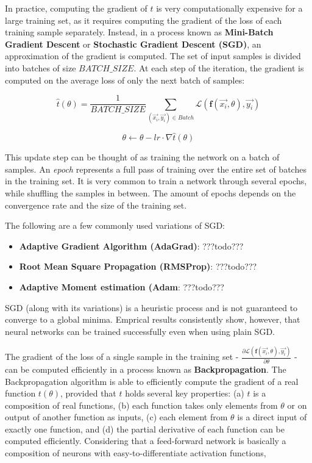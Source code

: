 In practice, computing the gradient of $t$ is very computationally expensive for a large training set, as it requires computing the gradient of the loss of each training sample separately. Instead, in a process known as \textbf{Mini-Batch Gradient Descent} or \textbf{Stochastic Gradient Descent (SGD)}, an approximation of the gradient is computed. The set of input samples is divided into batches of size $BATCH\_SIZE$. At each step of the iteration, the gradient is computed on the average loss of only the next batch of samples:

$$ \hat{t}(\theta) = \frac{1}{BATCH\_SIZE}\sum_{(\vec{x_i}, \vec{y_i}) \in Batch} \mathcal{L}(\textbf{f}(\vec{x_i}, \theta), \vec{y_i})  $$

$$ \theta \leftarrow \theta - \textit{lr} \cdot \nabla \hat{t}(\theta) $$

This update step can be thought of as training the network on a batch of samples. An \emph{epoch} represents a full pass of training over the entire set of batches in the training set. It is very common to train a network through several epochs, while shuffling the samples in between. The amount of epochs depends on the convergence rate and the size of the training set.

The following are a few commonly used variations of SGD:
\begin{itemize}
    \item \textbf{Adaptive Gradient Algorithm (AdaGrad)}: ???todo???
    \item \textbf{Root Mean Square Propagation (RMSProp)}: ???todo???
    \item \textbf{Adaptive Moment estimation (Adam}: ???todo???    
\end{itemize}

SGD (along with its variations) is a heuristic process and is not guaranteed to converge to a global minima. Emprical results consistently show, however, that neural networks can be trained successfully even when using plain SGD.

The gradient of the loss of a single sample in the training set -  $\frac{\partial \mathcal{L}(\textbf{f}(\vec{x_i}, \theta), \vec{y_i})}{\partial \theta}$ - can be computed efficiently in a process known as \textbf{Backpropagation}. The Backpropagation
algorithm is able to efficiently compute the gradient of a real function $t(\theta)$, provided that $t$ holds several key properties: (a) $t$ is a composition of real functions, (b) each function takes only elements from $\theta$ or on output of another function as inputs, (c) each element from $\theta$ is a direct input of exactly one function, and (d) the partial derivative of each function can be computed efficiently. Considering that a feed-forward network is basically a composition of neurons with easy-to-differentiate activation functions,

